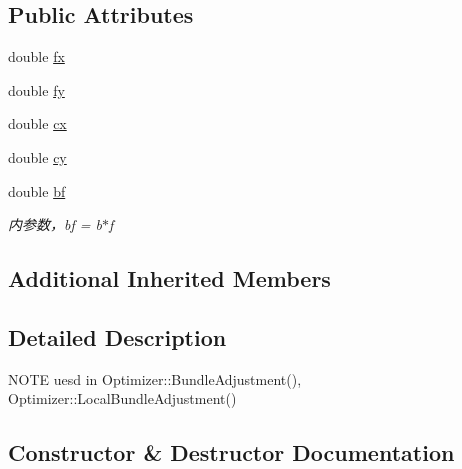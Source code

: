 \subsection*{Public Attributes}
\begin{DoxyCompactItemize}
\item 
double \mbox{\hyperlink{classg2o_1_1_edge_stereo_s_e3_project_x_y_z_a4fe9f6810d2cc1b4489f84853445e85f}{fx}}
\item 
double \mbox{\hyperlink{classg2o_1_1_edge_stereo_s_e3_project_x_y_z_a4e5b984e84437680b1f589822b4c0700}{fy}}
\item 
double \mbox{\hyperlink{classg2o_1_1_edge_stereo_s_e3_project_x_y_z_a0d786d2f349f8d4991be5303ad2b3c5d}{cx}}
\item 
double \mbox{\hyperlink{classg2o_1_1_edge_stereo_s_e3_project_x_y_z_a220dd625eb7479cc1dabb92a96a6664c}{cy}}
\item 
double \mbox{\hyperlink{classg2o_1_1_edge_stereo_s_e3_project_x_y_z_afc94291834aa40d18205e61ac802cbfc}{bf}}
\begin{DoxyCompactList}\small\item\em 内参数，bf = b$\ast$f \end{DoxyCompactList}\end{DoxyCompactItemize}
\subsection*{Additional Inherited Members}


\subsection{Detailed Description}
N\+O\+TE uesd in Optimizer\+::\+Bundle\+Adjustment(), Optimizer\+::\+Local\+Bundle\+Adjustment() 

\subsection{Constructor \& Destructor Documentation}
\mbox{\label{classg2o_1_1_edge_stereo_s_e3_project_x_y_z_a3a9c1b7c0b165f8c1c0690373481fea5}} 
